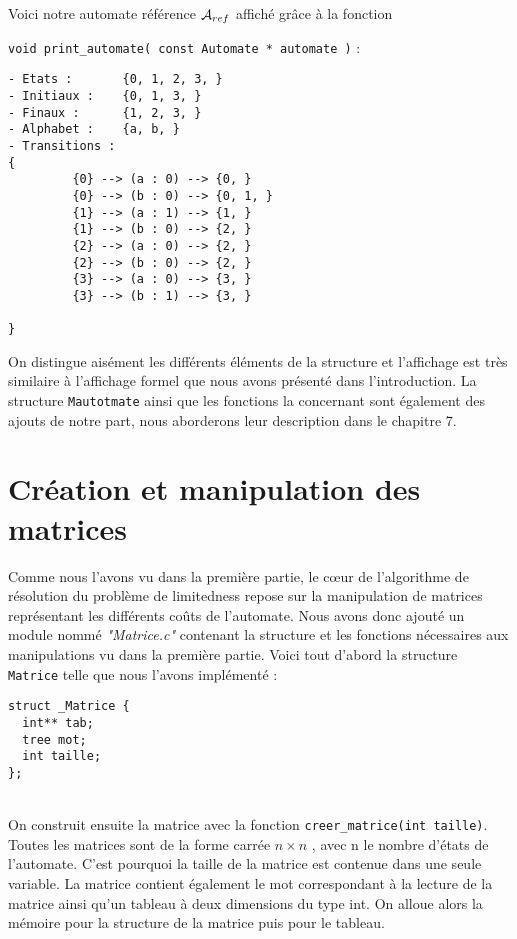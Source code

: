 \documentclass{report}
\begin{document}
Voici notre automate référence $\mathcal{A}_{ref}$ affiché grâce à la fonction
\begin{center}
\verb?void print_automate( const Automate * automate )? :\\ 
\end{center}

\begin{verbatim}
- Etats :       {0, 1, 2, 3, }
- Initiaux :    {0, 1, 3, }
- Finaux :      {1, 2, 3, }
- Alphabet :    {a, b, }
- Transitions : 
{
         {0} --> (a : 0) --> {0, }
         {0} --> (b : 0) --> {0, 1, }
         {1} --> (a : 1) --> {1, }
         {1} --> (b : 0) --> {2, }
         {2} --> (a : 0) --> {2, }
         {2} --> (b : 0) --> {2, }
         {3} --> (a : 0) --> {3, }
         {3} --> (b : 1) --> {3, }
  
}
\end{verbatim}
$ $\\

On distingue aisément les différents éléments de la structure et l'affichage est très similaire à l'affichage formel que nous avons présenté dans l'introduction. La structure \verb?Mautotmate? ainsi que les fonctions la concernant sont également des ajouts de notre part, nous aborderons leur description dans le chapitre 7.

\chapter{Création et manipulation des matrices}

Comme nous l'avons vu dans la première partie, le cœur de l'algorithme de résolution du problème de limitedness repose sur la manipulation de matrices représentant les différents coûts de l'automate. Nous avons donc ajouté un module nommé \textit{"Matrice.c"} contenant la structure et les fonctions nécessaires aux manipulations vu dans la première partie. Voici tout d'abord la structure \verb?Matrice? telle que nous l'avons implémenté : \\

\begin{lstlisting}[frame=single]
struct _Matrice {
  int** tab;
  tree mot;
  int taille;
};
\end{lstlisting}
$ $\\\\
On construit ensuite la matrice avec la fonction \verb?creer_matrice(int taille)?. Toutes les matrices sont de la forme carrée $n \times n$ , avec n le nombre d'états de l'automate. C'est pourquoi la taille de la matrice est contenue dans une seule variable. La matrice contient également le mot correspondant à la lecture de la matrice ainsi qu'un tableau à deux dimensions du type int. On alloue alors la mémoire pour la structure de la matrice puis pour le tableau.\\
\end{document}
